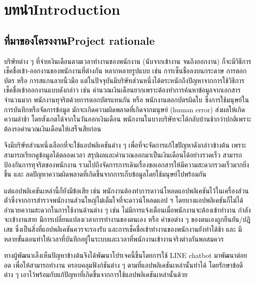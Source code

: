 \chapter{\ifcpe บทนำ\else Introduction\fi}

\section{\ifcpe ที่มาของโครงงาน\else Project rationale\fi}
บริษัทต่าง ๆ ที่จ่ายเงินเดือนตามเวลาทำงานของพนักงาน (นับจากเข้างาน จนถึงออกงาน) ก็จะมีวิธีการเช็คชื่อเข้า-ออกงานของพนักงานที่ต่างกัน 
หลากหลายรูปแบบ เช่น การเซ็นชื่อลงบนกระดาษ การตอกบัตร หรือ การสแกนลายนิ้วมือ
แต่ในปัจจุบันมีบริษัทส่วนหนึ่งได้ตระหนักถึงปัญหาจากการใช้วิธีการเช็คชื่อเข้าออกงานแบบดังกล่าว
เช่น คำนวณเงินเดือนยากเพราะต้องทำการค้นหาข้อมูลจากเอกสารจำนวนมาก 
พนักงานทุจริตด้วยการตอกบัตรแทนกัน 
หรือ พนักงานตอกบัตรผิดใบ 
ซึ่งการใช้มนุษย์ในการบันทึกหรือจัดการข้อมูล มักจะเกิดความผิดพลาดที่เกิดจากมนุษย์ (human error) 
ส่งผลให้เกิดความล่าช้า โดยสังเกตได้จากในวันออกเงินเดือน พนักงานในบางบริษัทจะได้กลับบ้านช้ากว่าปกติเพราะต้องรอคำนวณเงินเดือนให้เสร็จเสียก่อน

จึงมีบริษัทส่วนหนึ่งเลือกที่จะใช้แอปพลิเคชันต่าง ๆ เพื่อที่จะจัดการแก้ไขปัญหาดังกล่าวข้างต้น 
เพราะ สามารถเรียกดูข้อมูลได้ตลอดเวลา 
สรุปผลและคำนวณออกมาเป็นเงินเดือนได้อย่างรวดเร็ว 
สามารถป้องกันการทุจริตของพนักงาน 
รวมไปถึงจัดการการเดินเรื่องขอเอกสารให้มีความสะดวกรวดเร็วมากยิ่งขึ้น และ ลดปัญหาความผิดพลาดที่เกิดขึ้นจากการเก็บข้อมูลโดยใช้มนุษย์ไปพร้อมกัน

แต่แอปพลิเคชันเหล่านี้ก็ยังมีข้อเสีย เช่น 
พนักงานต้องทำการดาวน์โหลดแอปพลิเคชันไว้ในเครื่องส่วนตัวซึ่งจากการสำรวจพนักงานส่วนใหญ่ไม่เต็มใจที่จะดาวน์โหลดแอป ฯ โดยบางแอปพลิเคชันก็ไม่ได้อำนวยความสะดวกในการใช้งานด้านต่าง ๆ เช่น
ไม่มีการแจ้งเตือนเมื่อพนักงานจะต้องเข้าทำงาน กำลังจะเข้างานสาย มีการเปลี่ยนแปลงเวลาการทำงานของตนเอง หรือ คำขอต่าง ๆ ของตนเองถูกยืนยัน/ปฎิเสธ
ซึ่งเป็นสิ่งที่แอปพลิเคชันควรจะรองรับ 
และการเช็คชื่อเข้าทำงานของพนักงานยังทำได้ช้า และ มีหลายขั้นตอนทำให้เวลาที่บันทึกอยู่ในระบบและเวลาที่พนักงานเข้างานจริงต่างกันพอสมควร

ทางผู้พัฒนาเล็งเห็นปัญหาข้างต้นจึงได้พัฒนาโปรเจคนี้ขึ้นโดยการใช้ LINE chatbot มาพัฒนาต่อยอด
เพื่อให้สามารถทำงาน ครอบคลุมฟังก์ชันต่าง ๆ ตามที่แอปพลิเคชันเหล่านั้นทำได้
โดยรักษาข้อดีต่าง ๆ เอาไว้พร้อมกับแก้ปัญหาที่เกิดขึ้นจากการใช้แอปพลิเคชันเหล่านั้นด้วย

